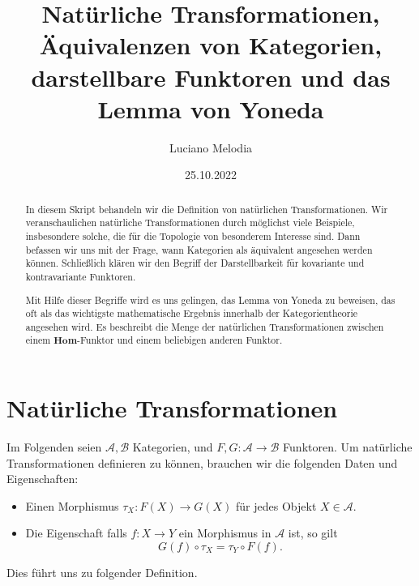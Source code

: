 \documentclass{article}
\title{Natürliche Transformationen, Äquivalenzen von Kategorien, darstellbare Funktoren und das Lemma von Yoneda}
\author{Luciano Melodia}
\date{25.10.2022}
\theoremstyle{plain}
\theoremstyle{definition}
\theoremstyle{remark}
\begin{document}
\maketitle

\begin{abstract}
In diesem Skript behandeln wir die Definition von natürlichen Transformationen. Wir veranschaulichen natürliche Transformationen durch möglichst viele Beispiele, insbesondere solche, die für die Topologie von besonderem Interesse sind. Dann befassen wir uns mit der Frage, wann Kategorien als äquivalent angesehen werden können. Schließlich klären wir den Begriff der Darstellbarkeit für kovariante und kontravariante Funktoren.

Mit Hilfe dieser Begriffe wird es uns gelingen, das Lemma von Yoneda zu beweisen, das oft als das wichtigste mathematische Ergebnis innerhalb der Kategorientheorie angesehen wird. Es beschreibt die Menge der natürlichen Transformationen zwischen einem $\textbf{Hom}$-Funktor und einem beliebigen anderen Funktor.
\end{abstract}

\section{Natürliche Transformationen}
Im Folgenden seien $\mathcal{A},\mathcal{B}$ Kategorien, und $F,G: \mathcal{A} \rightarrow \mathcal{B}$ Funktoren. Um natürliche Transformationen definieren zu können, brauchen wir die folgenden Daten und Eigenschaften:
\begin{itemize}
	\item Einen Morphismus $\tau_{X}: F(X) \rightarrow G(X)$ für jedes Objekt $X \in \mathcal{A}$.
	\item Die Eigenschaft falls $f: X \rightarrow Y$ ein Morphismus in $\mathcal{A}$ ist, so gilt
	\begin{equation}
		G(f) \circ \tau_{X} = \tau_{Y} \circ F(f).
	\end{equation}
\end{itemize}
Dies führt uns zu folgender Definition.
\end{document}
